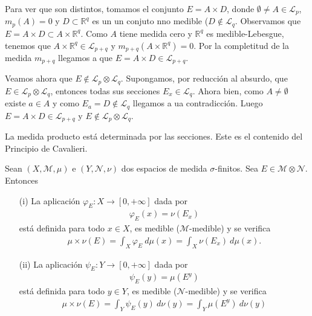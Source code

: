 \begin{obs}
    Para ver que son distintos, tomamos el conjunto $E = A \times D$, donde $\emptyset \not = A \in \mathcal{L}_p$, $m_p(A) = 0$ y $D \subset \mathbb{R}^q$ es un un conjuto nno medible ($D \not \in \mathcal{L}_q$. Observamos que $E = A \times D \subset A \times \mathbb{R}^q$. Como $A$ tiene medida cero y $\mathbb{R}^q$ es medible-Lebesgue, tenemos que $A \times \mathbb{R}^q \in \mathcal{L}_{p+q}$ y $m_{p+q}(A \times \mathbb{R}^q) = 0$. Por la completitud de la medida $m_{p+q}$ llegamos a que $E = A \times D \in \mathcal{L}_{p+q}$.

    Veamos ahora que $E \not \in \mathcal{L}_p \otimes \mathcal{L}_q$. Supongamos, por reducción al absurdo, que $E \in \mathcal{L}_p \otimes \mathcal{L}_q$, entonces todas sus secciones $E_x \in \mathcal{L}_q$. Ahora bien, como $A \not = \emptyset$ existe $a \in A$ y como $E_a = D \not \in \mathcal{L}_q$ llegamos a ua contradicción. Luego $E = A \times D \in \mathcal{L}_{p+q}$ y $E \not \in \mathcal{L}_p \otimes \mathcal{L}_q$.
\end{obs}
La medida producto está determinada por las secciones. Este es el contenido del Principio de Cavalieri.

\begin{teo}
    Sean $(X, \mathcal{M}, \mu)$ e $(Y, \mathcal{N}, \nu)$ dos espacios de medida $\sigma$-finitos. Sea $E \in \mathcal{M} \otimes \mathcal{N}$. Entonces
    \begin{enumerate}
        \item[(i)] La aplicación $\varphi_E : X \longrightarrow [0,+\infty]$ dada por
              \begin{align*}
                  \varphi_E(x) = \nu(E_x)
              \end{align*}
              está definida para todo $x \in X$, es medible ($\mathcal{M}$-medible) y se verifica
              \begin{align*}
                  \mu \times \nu (E) = \int_{X}{\varphi_E \ d\mu(x)} = \int_{X}{\nu(E_x) \ d\mu(x)}.
              \end{align*}
        \item[(ii)] La aplicación $\psi_E : Y \longrightarrow [0,+\infty]$ dada por
              \begin{align*}
                  \psi_E(y) = \mu(E^y)
              \end{align*}
              está definida para todo $y \in Y$, es medible ($\mathcal{N}$-medible) y se verifica
              \begin{align*}
                  \mu \times \nu (E) = \int_{Y}{\psi_E(y) \ d\nu(y)} = \int_{Y}{\mu(E^y) \ d\nu(y)}
              \end{align*}
    \end{enumerate}
\end{teo}

